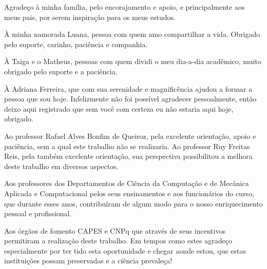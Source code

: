 \documentclass[dsc,divps,pdftex]{mmc}
\begin{document}
\begin{agradecimentos}
	
	Agradeço à minha família, pelo encorajamento e apoio, e principalmente aos meus pais, por serem inspiração para os meus estudos.
	
	À minha namorada Luana, pessoa com quem amo compartilhar a vida. Obrigado pelo suporte, carinho, paciência e companhia.
	
	À Taiga e o Matheus, pessoas com quem dividi o meu dia-a-dia acadêmico, muito obrigado pelo suporte e a paciência.
	
	À Adriana Ferreira, que com sua serenidade e magnificência ajudou a formar a pessoa que sou hoje. Infelizmente não foi possível agradecer pessoalmente, então deixo aqui registrado que sem você com certeza eu não estaria aqui hoje, obrigado.
	
	Ao professor Rafael Alves Bonfim de Queiroz, pela excelente orientação, apoio e paci\^encia, sem a qual este trabalho n\~ao se realizaria. Ao professor Ruy Freitas Reis, pela também excelente orientação, sua perspectiva possibilitou a melhora deste trabalho em diversos aspectos.
	
	Aos professores dos Departamentos de Ci\^encia da Computa\c{c}\~ao e de Mecânica Aplicada e Computacional pelos seus ensinamentos e aos funcion\'arios do curso, que durante esses anos,
	contribu\'iram de algum modo para o nosso enriquecimento pessoal e
	profissional.
	
	Aos órgãos de fomento CAPES e CNPq que através de seus incentivos permitiram a realização deste trabalho. Em tempos como estes agradeço especialmente por ter tido esta oportunidade e chegar aonde estou, que estas instituições possam preservadas e a ciência prevaleça!
	
\end{agradecimentos}

\end{document}
